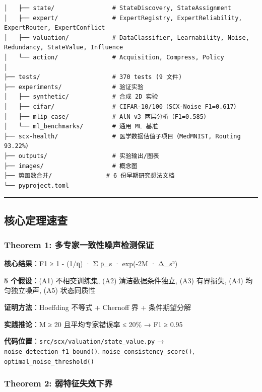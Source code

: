 \documentclass[
  12pt,
]{ctexart}
\begin{document}
\begin{verbatim}
│   ├── state/                # StateDiscovery, StateAssignment
│   ├── expert/               # ExpertRegistry, ExpertReliability, ExpertRouter, ExpertConflict
│   ├── valuation/            # DataClassifier, Learnability, Noise, Redundancy, StateValue, Influence
│   └── action/               # Acquisition, Compress, Policy
│
├── tests/                    # 370 tests (9 文件)
├── experiments/              # 验证实验
│   ├── synthetic/            # 合成 2D 实验
│   ├── cifar/                # CIFAR-10/100（SCX-Noise F1=0.617）
│   ├── mlip_case/            # AlN v3 两层分析（F1=0.585）
│   └── ml_benchmarks/        # 通用 ML 基准
├── scx-health/               # 医学数据估值子项目（MedMNIST, Routing 93.22%）
├── outputs/                  # 实验输出/图表
├── images/                   # 概念图
├── 势函数合并/               # 6 份早期研究想法文档
└── pyproject.toml
\end{verbatim}

\begin{center}\rule{0.5\linewidth}{0.5pt}\end{center}

\subsection{核心定理速查}\label{ux6838ux5fc3ux5b9aux7406ux901fux67e5}

\subsubsection{Theorem 1:
多专家一致性噪声检测保证}\label{theorem-1-ux591aux4e13ux5bb6ux4e00ux81f4ux6027ux566aux58f0ux68c0ux6d4bux4fddux8bc1}

\textbf{核心结果}：F1 ≥ 1 - (1/η) · Σ ρ\_s · exp(-2M · Δ\_s²)

\textbf{5 个假设}：(A1) 不相交训练集, (A2) 清洁数据条件独立, (A3)
有界损失, (A4) 均匀独立噪声, (A5) 状态同质性

\textbf{证明方法}：Hoeffding 不等式 + Chernoff 界 + 条件期望分解

\textbf{实践推论}：M ≥ 20 且平均专家错误率 ≤ 20\% → F1 ≥ 0.95

\textbf{代码位置}：\texttt{src/scx/valuation/state\_value.py} →
\texttt{noise\_detection\_f1\_bound()},
\texttt{noise\_consistency\_score()},
\texttt{optimal\_noise\_threshold()}

\subsubsection{Theorem 2:
弱特征失效下界}\label{theorem-2-ux5f31ux7279ux5f81ux5931ux6548ux4e0bux754c}
\end{document}
